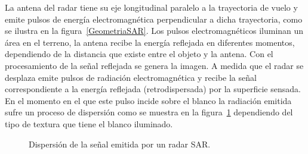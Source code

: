 La antena del radar tiene su eje longitudinal paralelo a la trayectoria de vuelo y emite pulsos de energía electromagnética perpendicular a dicha trayectoria, como se ilustra en la figura~\ref{GeometriaSAR}. Los pulsos electromagnéticos iluminan un área en el terreno, la antena recibe la energía reflejada en diferentes momentos, dependiendo de la distancia que existe entre el objeto y la antena. Con  el procesamiento de la señal reflejada se genera la imagen. 
A medida que el radar se desplaza emite pulsos de radiación electromagnética y recibe la señal correspondiente a la energía reflejada (retrodispersada)  por la superficie sensada. En el momento en el que este pulso incide sobre el blanco la radiación emitida sufre un proceso de dispersión como se muestra en la figura~\ref{SeñalDispersada} dependiendo del tipo de textura que tiene el blanco iluminado. 

\begin{figure}[H]
	\centering    
	\caption{\label{SeñalDispersada}Dispersión de la señal emitida por un radar SAR.}
\end{figure} 
%

